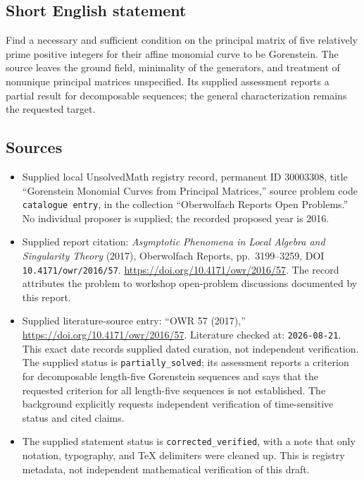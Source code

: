 \documentclass[11pt]{article}
\begin{document}
\subsection{Short English statement}
Find a necessary and sufficient condition on the principal matrix of five relatively prime positive integers for their affine monomial curve to be Gorenstein. The source leaves the ground field, minimality of the generators, and treatment of nonunique principal matrices unspecified. Its supplied assessment reports a partial result for decomposable sequences; the general characterization remains the requested target.
\subsection{Sources}
\begin{itemize}
\item Supplied local UnsolvedMath registry record, permanent ID \(30003308\), title ``Gorenstein Monomial Curves from Principal Matrices,'' source problem code \texttt{catalogue entry}, in the collection ``Oberwolfach Reports Open Problems.'' No individual proposer is supplied; the recorded proposed year is 2016.
\item Supplied report citation: \emph{Asymptotic Phenomena in Local Algebra and Singularity Theory} (2017), Oberwolfach Reports, pp.~3199--3259, DOI \texttt{10.4171/owr/2016/57}. \url{https://doi.org/10.4171/owr/2016/57}. The record attributes the problem to workshop open-problem discussions documented by this report.
\item Supplied literature-source entry: ``OWR 57 (2017),'' \url{https://doi.org/10.4171/owr/2016/57}. Literature checked at: \texttt{2026-08-21}. This exact date records supplied dated curation, not independent verification. The supplied status is \texttt{partially\_solved}; its assessment reports a criterion for decomposable length-five Gorenstein sequences and says that the requested criterion for all length-five sequences is not established. The background explicitly requests independent verification of time-sensitive status and cited claims.
\item The supplied statement status is \texttt{corrected\_verified}, with a note that only notation, typography, and TeX delimiters were cleaned up. This is registry metadata, not independent mathematical verification of this draft.
\end{itemize}
\end{document}
